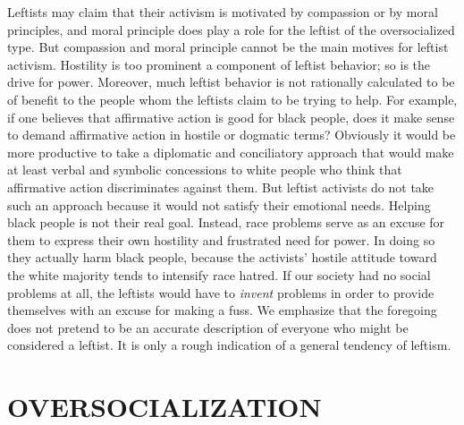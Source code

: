  Leftists may claim that their activism is motivated by compassion or by moral principles, and moral principle does play a role for the leftist of the oversocialized type. But compassion and moral principle cannot be the main motives for leftist activism. Hostility is too prominent a component of leftist behavior; so is the drive for power. Moreover, much leftist behavior is not rationally calculated to be of benefit to the people whom the leftists claim to be trying to help. For example, if one believes that affirmative action is good for black people, does it make sense to demand affirmative action in hostile or dogmatic terms? Obviously it would be more productive to take a diplomatic and conciliatory approach that would make at least verbal and symbolic concessions to white people who think that affirmative action discriminates against them. But leftist activists do not take such an approach because it would not satisfy their emotional needs. Helping black people is not their real goal. Instead, race problems serve as an excuse for them to express their own hostility and frustrated need for power. In doing so they actually harm black people, because the activists’ hostile attitude toward the white majority tends to intensify race hatred.
 If our society had no social problems at all, the leftists would have to {\em invent} problems in order to provide themselves with an excuse for making a fuss.
 We emphasize that the foregoing does not pretend to be an accurate description of everyone who might be considered a leftist. It is only a rough indication of a general tendency of leftism.

\chapter{OVERSOCIALIZATION}

